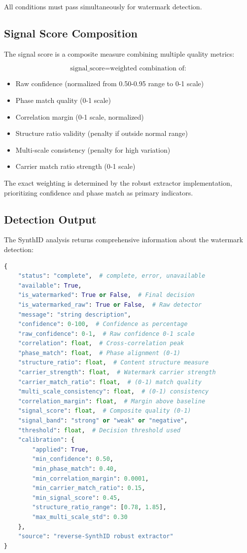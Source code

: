 \documentclass[12pt,a4paper]{book}
\begin{document}
All conditions must pass simultaneously for watermark detection.

\subsection{Signal Score Composition}
The signal score is a composite measure combining multiple quality metrics:

\begin{equation}
\text{signal\_score} = \text{weighted combination of:}
\end{equation}

\begin{itemize}
    \item Raw confidence (normalized from 0.50-0.95 range to 0-1 scale)
    \item Phase match quality (0-1 scale)
    \item Correlation margin (0-1 scale, normalized)
    \item Structure ratio validity (penalty if outside normal range)
    \item Multi-scale consistency (penalty for high variation)
    \item Carrier match ratio strength (0-1 scale)
\end{itemize}

The exact weighting is determined by the robust extractor implementation, prioritizing confidence and phase match as primary indicators.

\subsection{Detection Output}
The SynthID analysis returns comprehensive information about the watermark detection:

\begin{lstlisting}[language=Python]
{
    "status": "complete",  # complete, error, unavailable
    "available": True,
    "is_watermarked": True or False,  # Final decision
    "is_watermarked_raw": True or False,  # Raw detector
    "message": "string description",
    "confidence": 0-100,  # Confidence as percentage
    "raw_confidence": 0-1,  # Raw confidence 0-1 scale
    "correlation": float,  # Cross-correlation peak
    "phase_match": float,  # Phase alignment (0-1)
    "structure_ratio": float,  # Content structure measure
    "carrier_strength": float,  # Watermark carrier strength
    "carrier_match_ratio": float,  # (0-1) match quality
    "multi_scale_consistency": float,  # (0-1) consistency
    "correlation_margin": float,  # Margin above baseline
    "signal_score": float,  # Composite quality (0-1)
    "signal_band": "strong" or "weak" or "negative",
    "threshold": float,  # Decision threshold used
    "calibration": {
        "applied": True,
        "min_confidence": 0.50,
        "min_phase_match": 0.40,
        "min_correlation_margin": 0.0001,
        "min_carrier_match_ratio": 0.15,
        "min_signal_score": 0.45,
        "structure_ratio_range": [0.78, 1.85],
        "max_multi_scale_std": 0.30
    },
    "source": "reverse-SynthID robust extractor"
}
\end{lstlisting}
\end{document}
